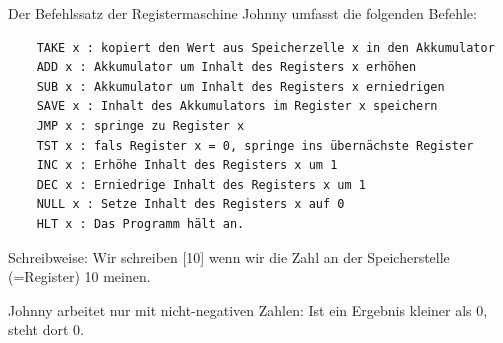 
Der Befehlssatz der Registermaschine Johnny umfasst die folgenden Befehle:


\begin{verbatim}
    TAKE x : kopiert den Wert aus Speicherzelle x in den Akkumulator
    ADD x : Akkumulator um Inhalt des Registers x erhöhen
    SUB x : Akkumulator um Inhalt des Registers x erniedrigen
    SAVE x : Inhalt des Akkumulators im Register x speichern
    JMP x : springe zu Register x
    TST x : fals Register x = 0, springe ins übernächste Register
    INC x : Erhöhe Inhalt des Registers x um 1
    DEC x : Erniedrige Inhalt des Registers x um 1
    NULL x : Setze Inhalt des Registers x auf 0
    HLT x : Das Programm hält an.
\end{verbatim}

Schreibweise: Wir schreiben [10] wenn wir die Zahl an der Speicherstelle (=Register) 10 meinen.

Johnny arbeitet nur mit nicht-negativen Zahlen: Ist ein Ergebnis kleiner als 0, steht dort 0.


